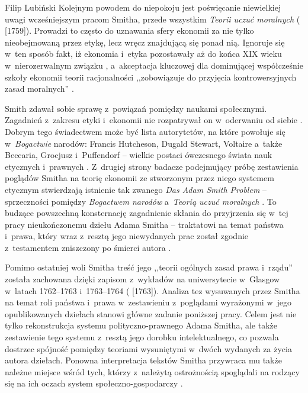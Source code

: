 \begin{artplenv}{Filip Lubiński}
Kolejnym powodem do niepokoju jest poświęcanie niewielkiej uwagi wcześniejszym pracom Smitha, przede wszystkim
\textit{Teorii uczuć moralnych}
(\cite{smith_teoria_1989} [1759]).
Prowadzi to często do uznawania sfery
ekonomii za nie tylko nieobejmowaną przez etykę, lecz wręcz znajdującą się ponad nią. Ignoruje się w~ten sposób fakt,
iż ekonomia i~etyka pozostawały aż do końca XIX wieku w~nierozerwalnym związku
\parencite[s.~235]{rawls_wyklady_2010},
a~akceptacja kluczowej dla dominującej współcześnie szkoły ekonomii teorii racjonalności ,,zobowiązuje do
przyjęcia kontrowersyjnych zasad moralnych''
\parencite[s.~50]{hausman_etyka_2017}.

Smith zdawał sobie sprawę z~powiązań pomiędzy naukami społecznymi. Zagadnień z~zakresu etyki i~ekonomii nie
rozpatrywał on w~oderwaniu od siebie
\parencite[s.~130]{soll_reckoning:_2014}.
Dobrym tego świadectwem może być
lista autorytetów, na które powołuje się w~\textit{Bogactwie }narodów: Francis Hutcheson, Dugald Stewart,
Voltaire a~także Beccaria, Grocjusz i~Puffendorf -- wielkie postaci ówczesnego świata nauk etycznych i~prawnych
\parencite[s.~654]{boorstin_discoverers:_1983}.
Z~drugiej strony badacze podejmujący próbę zestawienia poglądów
Smitha na teorię ekonomii ze stworzonym przez niego systemem etycznym stwierdzają istnienie tak zwanego \textit{Das
Adam Smith Problem} -- sprzeczności pomiędzy \textit{Bogactwem narodów} a~\textit{Teorią uczuć moralnych}
\parencite[s.~215–216]{sedlacek_ekonomia_2012}.
To budzące powszechną konsternację zagadnienie skłania do
przyjrzenia się w~tej pracy nieukończonemu dziełu Adama Smitha -- traktatowi na temat państwa i~prawa, który
wraz z~resztą jego niewydanych prac został zgodnie z~testamentem zniszczony po śmierci autora
\parencite[s.~140]{buchan_adam_2008}.

Pomimo ostatniej woli Smitha treść jego ,,teorii ogólnych zasad prawa i~rządu'' została zachowana dzięki
zapisom z~wykładów na uniwersytecie w~Glasgow w~latach 1762--1763 i~1763--1764
(\cite{smith_lectures_1982} [1763]).
Analiza tez wysuwanych przez Smitha na temat roli państwa i~prawa w~zestawieniu z~poglądami wyrażonymi w~jego
opublikowanych dziełach stanowi główne zadanie poniższej pracy. Celem jest nie tylko rekonstrukcja systemu
polityczno-prawnego Adama Smitha, ale także zestawienie tego systemu z~resztą jego dorobku intelektualnego, co pozwala
dostrzec spójność pomiędzy teoriami wysuniętymi w~dwóch wydanych za życia autora dziełach. Ponowna interpretacja
tekstów Smitha przywraca mu także należne miejsce wśród tych, którzy z~należytą ostrożnością spoglądali na rodzący się
na ich oczach system społeczno-gospodarczy
\parencite[s.~83]{ferguson_wielka_2017}.



\end{artplenv}
